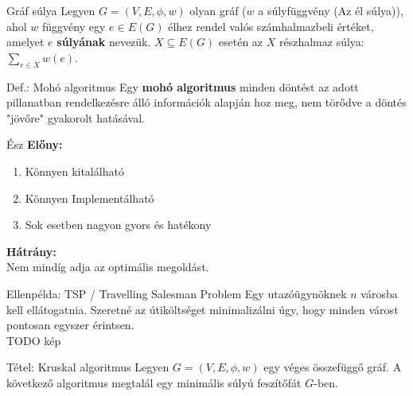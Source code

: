 \documentclass{beamer}
\begin{document}
\begin{frame}
\begin{block}{Gráf súlya}
Legyen $G = (V, E, {\phi}, w)$ olyan gráf ($w$ a súlyfüggvény (Az él súlya)), ahol $w$ függvény egy $e \in E(G)$ élhez rendel valós számhalmazbeli értéket, amelyet $e$ \textbf{súlyának} nevezük. $X \subseteq E(G)$ esetén az $X$ részhalmaz súlya:\\
\medskip
$\sum_{e \in X} w(e)$.
\end{block}

\begin{block}{Def.: Mohó algoritmus}
Egy \textbf{mohó algoritmus} minden döntést az adott pillanatban rendelkezésre álló információk alapján hoz meg, nem törődve a döntés "jövőre" gyakorolt hatásával.
\end{block}

\begin{block}{Ész}
\textbf{Előny:}\\
\medskip
\begin{enumerate}
\item Könnyen kitalálható
\item Könnyen Implementálható
\item Sok esetben nagyon gyors és hatékony
\end{enumerate}
\textbf{Hátrány:}\\
Nem mindíg adja az optimális megoldást.
\end{block}

\begin{block}{Ellenpélda: TSP / Travelling Salesman Problem}
Egy utazóügynöknek $n$ városba kell ellátogatnia. Szeretné az útiköltséget minimalizálni úgy, hogy minden várost pontosan egyszer érintsen.\\
\bigskip
TODO kép
\end{block}
\end{frame}

\begin{frame}
\begin{block}{Tétel: Kruskal algoritmus}
Legyen $G = (V, E, {\phi}, w)$ egy véges összefüggő gráf. A következő algoritmus megtalál egy minimális súlyú feszítőfát $G$-ben.
    
\end{block}
\end{frame}
\end{document}

